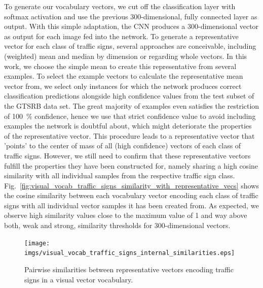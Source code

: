 To generate our vocabulary vectors, we cut off the classification layer with softmax activation and use the previous \num{300}-dimensional, fully connected layer as output.
With this simple adaptation, the \ac{CNN} produces a \num{300}-dimensional vector as output for each image fed into the network. 
To generate a representative vector for each class of traffic signs, several approaches are conceivable, including (weighted) mean and median by dimension or regarding whole vectors.
In this work, we choose the simple mean to create this representative from several examples.
To select the example vectors to calculate the representative mean vector from, we select only instances for which the network produces correct classification predictions alongside high confidence values from the test subset of the \ac{GTSRB} data set.
The great majority of examples even satisfies the restriction of \SI{100}{\percent} confidence, hence we use that strict confidence value to avoid including examples the network is doubtful about, which might deteriorate the properties of the representative vector. 
This procedure leads to a representative vector that 'points' to the center of mass of all (high confidence) vectors of each class of traffic signs.
However, we still need to confirm that these representative vectors fulfill the properties they have been constructed for, namely sharing a high cosine similarity with all individual samples from the respective traffic sign class.
Fig.~\ref{fig:visual_vocab_traffic_signs_similarity_with_representative_vecs} shows the cosine similarity between each vocabulary vector encoding each class of traffic signs with all individual vector samples it has been created from.
As expected, we observe high similarity values close to the maximum value of \num{1} and way above both, weak and strong, similarity thresholds for \num{300}-dimensional vectors.

\begin{figure}[t]
    \centering
    \texttt{[image: imgs/visual\_vocab\_traffic\_signs\_internal\_similarities.eps]}
    \caption{Pairwise similarities between representative vectors encoding traffic signs in a visual vector vocabulary.}
    \label{fig:visual_vocab_traffic_signs_internal_similarities}
\end{figure}

